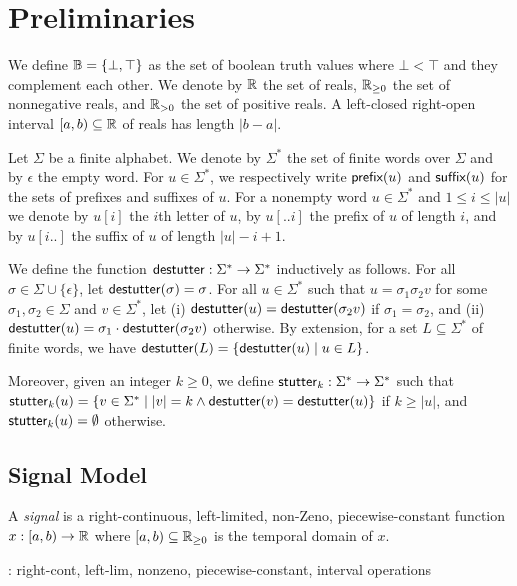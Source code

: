 \section{Preliminaries}

We define $\mathbb{B} = \{ \bot, \top \}$ as the set of boolean truth values where $\bot < \top$ and they complement each other.
We denote by $\mathbb{R}$ the set of reals, $\mathbb{R}_{\geq 0}$ the set of nonnegative reals, and $\mathbb{R}_{> 0}$ the set of positive reals.
A left-closed right-open interval $[a,b) \subseteq \mathbb{R}$ of reals has length $|b-a|$.

Let $\Sigma$ be a finite alphabet.
We denote by $\Sigma^*$ the set of finite words over $\Sigma$ and by $\epsilon$ the empty word.
For $u \in \Sigma^*$, we respectively write $\textsf{prefix}(u)$ and $\textsf{suffix}(u)$ for the sets of prefixes and suffixes of $u$.
For a nonempty word $u \in \Sigma^*$ and $1 \leq i \leq |u|$ we denote by $u[i]$ the $i$th letter of $u$, by $u[..i]$ the prefix of $u$ of length $i$, and by $u[i..]$ the suffix of $u$ of length $|u| - i + 1$. 

We define the function $\mathsf{destutter} : \Sigma^* \to \Sigma^*$ inductively as follows.
For all $\sigma \in \Sigma \cup \{\epsilon\}$, let $\mathsf{destutter}(\sigma) = \sigma$.
For all $u \in \Sigma^*$ such that $u = \sigma_1 \sigma_2 v$ for some $\sigma_1,\sigma_2 \in \Sigma$ and $v \in \Sigma^*$, let (i) $\mathsf{destutter}(u) = \mathsf{destutter}(\sigma_2 v)$ if $\sigma_1 = \sigma_2$, and (ii) $\mathsf{destutter}(u) = \sigma_1 \cdot \mathsf{destutter}(\sigma_2 v)$ otherwise.
By extension, for a set $L \subseteq \Sigma^*$ of finite words, we have $\destutter(L) = \{\destutter(u) \st u \in L\}$.

Moreover, given an integer $k \geq 0$, we define $\mathsf{stutter}_k : \Sigma^* \to \Sigma^*$ such that $\stutter_k(u) = \{v \in \Sigma^* \st |v| = k \land \destutter(v) = \destutter(u)\}$ if $k \geq |u|$, and $\mathsf{stutter}_k(u) = \emptyset$ otherwise.

\subsection{Signal Model}

\begin{definition}
	A \emph{signal} is a right-continuous, left-limited, non-Zeno, piecewise-constant function $x : [a,b) \to \mathbb{R}$ where $[a,b) \subseteq \mathbb{R}_{\geq 0}$ is the temporal domain of $x$.
\end{definition}

\TODO: right-cont, left-lim, nonzeno, piecewise-constant, interval operations

